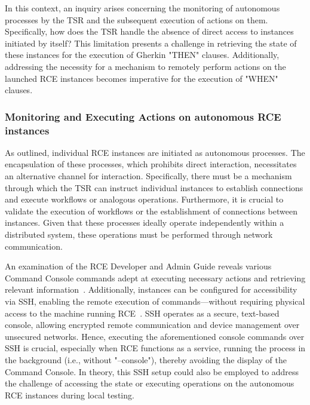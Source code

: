 In this context, an inquiry arises concerning the monitoring of autonomous processes by the \ac{TSR} and the subsequent execution of actions on them. Specifically, how does the \ac{TSR} handle the absence of direct access to instances initiated by itself? This limitation presents a challenge in retrieving the state of these instances for the execution of Gherkin "THEN" clauses. Additionally, addressing the necessity for a mechanism to remotely perform actions on the launched RCE instances becomes imperative for the execution of "WHEN" clauses.


\subsubsection{Monitoring and Executing Actions on autonomous RCE instances}
As outlined, individual RCE instances are initiated as autonomous processes. The encapsulation of these processes, which prohibits direct interaction, necessitates an alternative channel for interaction. Specifically, there must be a mechanism through which the \ac{TSR} can instruct individual instances to establish connections and execute workflows or analogous operations. Furthermore, it is crucial to validate the execution of workflows or the establishment of connections between instances. Given that these processes ideally operate independently within a distributed system, these operations must be performed through network communication.

An examination of the \ac{RCE} Developer and Admin Guide reveals various Command Console commands adept at executing necessary actions and retrieving relevant information~\cite{rceDevGuide10x}. Additionally, instances can be configured for accessibility via \ac{SSH}, enabling the remote execution of commands—without requiring physical access to the machine running RCE~\cite{rceDevGuide10x}. \ac{SSH} operates as a secure, text-based console, allowing encrypted remote communication and device management over unsecured networks. Hence, executing the aforementioned console commands over \ac{SSH} is crucial, especially when \ac{RCE} functions as a service, running the process in the background (i.e., without "--console"), thereby avoiding the display of the Command Console. In theory, this \ac{SSH} setup could also be employed to address the challenge of accessing the state or executing operations on the autonomous \ac{RCE} instances during local testing.

